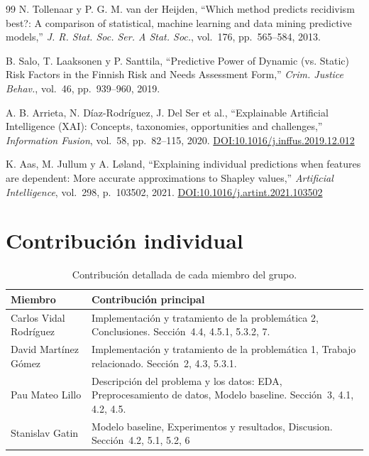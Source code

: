 \documentclass[11pt,a4paper]{article}
\begin{document}
\begin{thebibliography}{99}
N. Tollenaar y P. G. M. van der Heijden,
``Which method predicts recidivism best?: A comparison of statistical, machine learning and data mining predictive models,''
\textit{J. R. Stat. Soc. Ser. A Stat. Soc.},
vol.~176, pp.~565--584, 2013.

B. Salo, T. Laaksonen y P. Santtila,
``Predictive Power of Dynamic (vs. Static) Risk Factors in the Finnish Risk and Needs Assessment Form,''
\textit{Crim. Justice Behav.},
vol.~46, pp.~939--960, 2019.

A. B. Arrieta, N. Díaz-Rodríguez, J. Del Ser et al.,
``Explainable Artificial Intelligence (XAI): Concepts, taxonomies, opportunities and challenges,''
\textit{Information Fusion},
vol.~58, pp.~82--115, 2020.
\href{https://doi.org/10.1016/j.inffus.2019.12.012}{DOI:10.1016/j.inffus.2019.12.012}

K. Aas, M. Jullum y A. Løland,
``Explaining individual predictions when features are dependent: More accurate approximations to Shapley values,''
\textit{Artificial Intelligence},
vol.~298, p.~103502, 2021.
\href{https://doi.org/10.1016/j.artint.2021.103502}{DOI:10.1016/j.artint.2021.103502}

\end{thebibliography}

\newpage
\appendix

\section{Contribución individual}

\begin{table}[H]
\centering
\caption{Contribución detallada de cada miembro del grupo.}
\small
\begin{tabular}{@{}lp{11cm}@{}}
\toprule
\textbf{Miembro} & \textbf{Contribución principal} \\
\midrule
Carlos Vidal Rodríguez & Implementación y tratamiento de la problemática 2, Conclusiones. Sección~4.4, 4.5.1, 5.3.2, 7.\\ [4pt]
David Martínez Gómez   & Implementación y tratamiento de la problemática 1, Trabajo relacionado. Sección~2, 4.3, 5.3.1. \\ [4pt]
Pau Mateo Lillo        & Descripción del problema y los datos: EDA, Preprocesamiento de datos, Modelo baseline. Sección~3, 4.1, 4.2, 4.5. \\ [4pt]
Stanislav Gatin        & Modelo baseline, Experimentos y resultados, Discusion. Sección~4.2, 5.1, 5.2, 6 \\
\bottomrule
\end{tabular}
\end{table}
\end{document}
